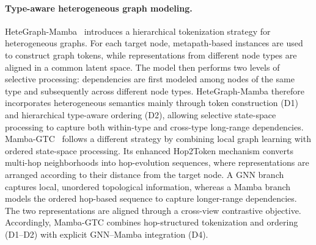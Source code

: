 \documentclass[acmsmall]{acmart}
\begin{document}
\paragraph{\textbf{Type-aware heterogeneous graph modeling.}}
HeteGraph-Mamba~\cite{pan2024hetegraph} introduces a hierarchical
tokenization strategy for heterogeneous graphs. For each target node,
metapath-based instances are used to construct graph tokens, while
representations from different node types are aligned in a common latent
space. The model then performs two levels of selective processing: dependencies
are first modeled among nodes of the same type and subsequently across
different node types. HeteGraph-Mamba therefore incorporates heterogeneous
semantics mainly through token construction (D1) and hierarchical type-aware
ordering (D2), allowing selective state-space processing to capture both
within-type and cross-type long-range dependencies.
Mamba-GTC~\cite{Meng2026Mamba-GTC} follows a different strategy by combining
local graph learning with ordered state-space processing. Its enhanced
Hop2Token mechanism converts multi-hop neighborhoods into hop-evolution
sequences, where representations are arranged according to their distance from
the target node. A GNN branch captures local, unordered topological
information, whereas a Mamba branch models the ordered hop-based sequence to
capture longer-range dependencies. The two representations are aligned through
a cross-view contrastive objective. Accordingly, Mamba-GTC combines
hop-structured tokenization and ordering (D1--D2) with explicit GNN--Mamba
integration (D4).
\end{document}
